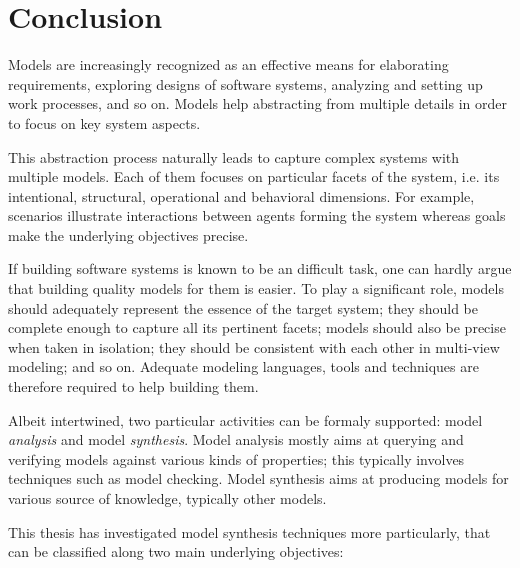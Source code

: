 \chapter{Conclusion\label{chapter:conclusion}}

Models are increasingly recognized as an effective means for elaborating requirements, exploring designs of software systems, analyzing and setting up work processes, and so on. Models help abstracting from multiple details in order to focus on key system aspects.

This abstraction process naturally leads to capture complex systems with multiple models. Each of them focuses on particular facets of the system, i.e. its intentional, structural, operational and behavioral dimensions. For example, scenarios illustrate interactions between agents forming the system whereas goals make the underlying objectives precise.

If building software systems is known to be an difficult task, one can hardly argue that building quality models for them is easier.  To play a significant role, models should adequately represent the essence of the target system; they should be complete enough to capture all its pertinent facets; models should also be precise when taken in isolation; they should be consistent with each other in multi-view modeling; and so on. Adequate modeling languages, tools and techniques are therefore required to help building them.

Albeit intertwined, two particular activities can be formaly supported: model \emph{analysis} and model \emph{synthesis}. Model analysis mostly aims at querying and verifying models against various kinds of properties; this typically involves techniques such as model checking. Model synthesis aims at producing models for various source of knowledge, typically other models.

This thesis has investigated model synthesis techniques more particularly, that can be classified along two main underlying objectives:

